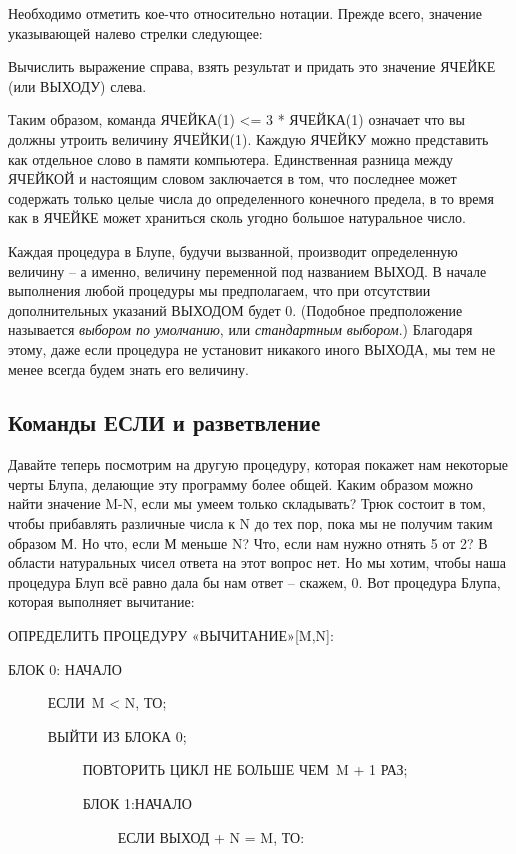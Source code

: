 \documentclass[../main.tex]{subfiles}
\begin{document}
Необходимо отметить кое-что относительно нотации. Прежде всего, значение указывающей налево стрелки следующее:

Вычислить выражение справа, взять результат и придать это значение ЯЧЕЙКЕ (или ВЫХОДУ) слева.

Таким образом, команда ЯЧЕЙКА(1) \textless= 3 * ЯЧЕЙКА(1) означает что вы должны утроить величину ЯЧЕЙКИ(1). Каждую ЯЧЕЙКУ можно представить как отдельное слово в памяти компьютера. Единственная разница между ЯЧЕЙКОЙ и настоящим словом заключается в том, что последнее может содержать только целые числа до определенного конечного предела, в то время как в ЯЧЕЙКЕ может храниться сколь угодно большое натуральное число.

Каждая процедура в Блупе, будучи вызванной, производит определенную величину \--- а именно, величину переменной под названием ВЫХОД\@. В начале выполнения любой процедуры мы предполагаем, что при отсутствии дополнительных указаний ВЫХОДОМ будет 0. (Подобное предположение называется \emph{выбором по умолчанию}, или \emph{стандартным выбором}.) Благодаря этому, даже если процедура не установит никакого иного ВЫХОДА, мы тем не менее всегда будем знать его величину.


\subsection{Команды ЕСЛИ и разветвление}

Давайте теперь посмотрим на другую процедуру, которая покажет нам некоторые черты Блупа, делающие эту программу более общей. Каким образом можно найти значение M-N, если мы умеем только складывать? Трюк состоит в том, чтобы прибавлять различные числа к N до тех пор, пока мы не получим таким образом М\@. Но что, если М меньше N? Что, если нам нужно отнять 5 от 2? В области натуральных чисел ответа на этот вопрос нет. Но мы хотим, чтобы наша процедура Блуп всё равно дала бы нам ответ \--- скажем, 0. Вот процедура Блупа, которая выполняет вычитание:

ОПРЕДЕЛИТЬ ПРОЦЕДУРУ «ВЫЧИТАНИЕ»{[}M,N{]}:

БЛОК 0: НАЧАЛО

~~~~~ ЕСЛИ~M \textless{} N, ТО;

~~~~~ ВЫЙТИ ИЗ БЛОКА 0;

~~~~~~~~~~ ПОВТОРИТЬ ЦИКЛ НЕ БОЛЬШЕ ЧЕМ~M + 1 РАЗ;

~~~~~~~~~~ БЛОК 1:НАЧАЛО

~~~~~~~~~~~~~~~ ЕСЛИ ВЫХОД + N = M, ТО:
\end{document}
